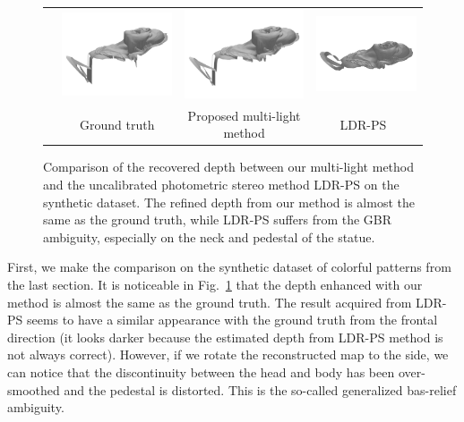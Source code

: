 \begin{figure}[H]
{\begin{tabular}{c c c c}
   \multirow{-6}{*}{\parbox[t]{2.5mm}{}} &    
   \includegraphics[height = 0.22\linewidth]{figures/result/ps2_gt.pdf} 
   &
   \includegraphics[height = 0.22\linewidth]{figures/result/ps2_robust.pdf} &
   \includegraphics[height = 0.22\linewidth]{figures/result/ps2_LDR.pdf} \\

  {} & {Ground truth} & {Proposed multi-light method}  & {LDR-PS~\cite{favaro2012closed}}
 \end{tabular}}
\caption{Comparison of the recovered depth between our multi-light method and the uncalibrated photometric stereo method LDR-PS on the synthetic dataset. 
The refined depth from our method is almost the same as the ground truth, while LDR-PS suffers from the GBR ambiguity, especially on the neck and pedestal of the statue.}
\label{fig:ps_comp_syn}
\end{figure}


First, we make the comparison on the synthetic dataset of colorful patterns from the last section.
It is noticeable in Fig.~\ref{fig:ps_comp_syn} that the depth enhanced with our method is almost the same as the ground truth.
The result acquired from LDR-PS seems to have a similar appearance with the ground truth from the frontal direction (it looks darker because the estimated depth from LDR-PS method is not always correct).
However, if we rotate the reconstructed map to the side, we can notice that the discontinuity between the head and body has been over-smoothed and the pedestal is distorted.
This is the so-called generalized bas-relief ambiguity.


